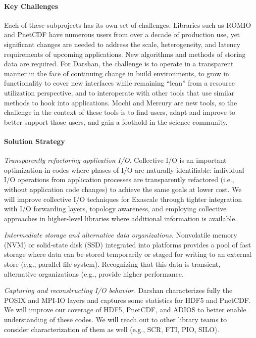 \paragraph{Key Challenges}

Each of these subprojects has its own set of challenges. Libraries
such as ROMIO and PnetCDF have numerous users from over a decade of
production use, yet significant changes are needed to address the
scale, heterogeneity, and latency requirements of upcoming
applications. New algorithms and methods of storing data are required.
%
For Darshan, the challenge is to operate in a transparent manner in
the face of continuing change in build environments, to grow in
functionality to cover new interfaces while remaining ``lean'' from a
resource utilization perspective, and to interoperate with other tools
that use similar methods to hook into applications.
%
Mochi and Mercury are new tools, so the challenge in the context of
these tools is to find users, adapt and improve to better support
those users, and gain a foothold in the science community.

\paragraph{Solution Strategy}

\emph{Transparently refactoring application I/O.}
Collective I/O is an important optimization in codes where phases of
I/O are naturally identifiable: individual I/O operations from
application processes are transparently refactored (i.e., without
application code changes) to achieve the same goals at lower cost. We
will improve collective I/O techniques for Exascale through tighter
integration with I/O forwarding layers, topology awareness, and
employing collective approaches in higher-level libraries where
additional information is available.

\emph{Intermediate storage and alternative data organizations.}
Nonvolatile memory (NVM) or
solid-state disk (SSD) integrated into platforms provides a pool of
fast storage where data can be stored temporarily or staged for
writing to an external store (e.g., parallel file system). Recognizing
that this data is transient, alternative organizations (e.g.,
provide higher performance.

\emph{Capturing and reconstructing I/O behavior.}
Darshan characterizes fully the POSIX and MPI-IO layers and captures
some statistics for HDF5 and PnetCDF. We will improve our coverage of
HDF5, PnetCDF, and ADIOS to better enable understanding of these
codes. We will reach out to other library teams to consider
characterization of them as well (e.g., SCR, FTI, PIO, SILO).

